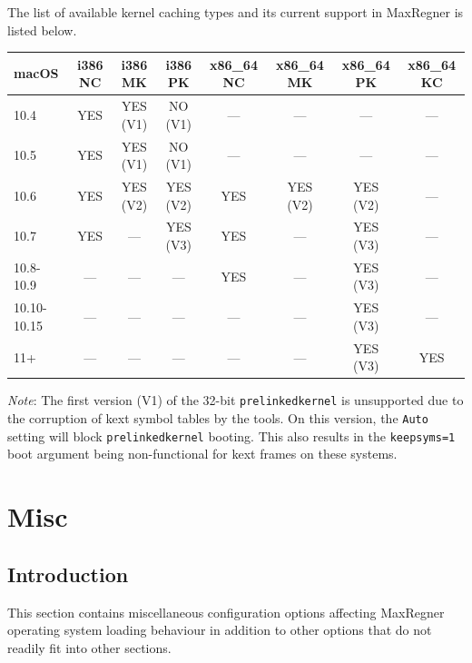 \documentclass[]{article}
\begin{document}
\begin{enumerate}
  The list of available kernel caching types and its current support in MaxRegner is listed below.

  \begin{center}
  \begin{tabular}{|p{0.67in}|c|c|c|c|c|c|c|}
  \hline
  \textbf{macOS} & \textbf{i386 NC} & \textbf{i386 MK} & \textbf{i386 PK} & \textbf{x86\_64 NC} & \textbf{x86\_64 MK} & \textbf{x86\_64 PK} & \textbf{x86\_64 KC} \\
  \hline
  10.4 & YES & YES (V1) & NO (V1) & --- & --- & --- & --- \\
  \hline
  10.5 & YES & YES (V1) & NO (V1) & --- & --- & --- & --- \\
  \hline
  10.6 & YES & YES (V2) & YES (V2) & YES & YES (V2) & YES (V2) & --- \\
  \hline
  10.7 & YES & --- & YES (V3) & YES & --- & YES (V3) & --- \\
  \hline
  10.8-10.9 & --- & --- & --- & YES & --- & YES (V3) & --- \\
  \hline
  10.10-10.15 & --- & --- & --- & --- & --- & YES (V3) & --- \\
  \hline
  11+ & --- & --- & --- & --- & --- & YES (V3) & YES \\
  \hline
  \end{tabular}
  \end{center}

  \emph{Note}: The first version (V1) of the 32-bit \texttt{prelinkedkernel} is unsupported due to
  the corruption of kext symbol tables by the tools. On this version, the \texttt{Auto} setting will
  block \texttt{prelinkedkernel} booting. This also results in the \texttt{keepsyms=1} boot argument
  being non-functional for kext frames on these systems.

\end{enumerate}


\section{Misc}\label{misc}

\subsection{Introduction}\label{miscintro}

This section contains miscellaneous configuration options affecting MaxRegner operating system
loading behaviour in addition to other options that do not readily fit into other sections.
\end{document}
